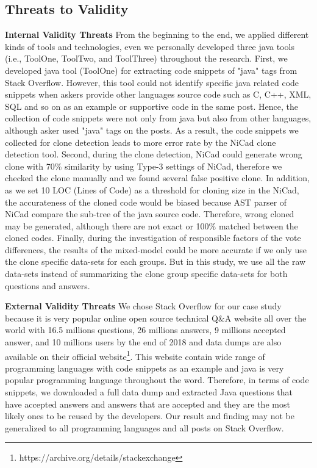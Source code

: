 \documentclass[conference]{IEEEtran}
\begin{document}
\subsection{Threats to Validity}\label{TTV}
\textbf{Internal Validity Threats} From the beginning to the end, we applied different kinds of tools and technologies, even we personally developed three java tools (i.e., ToolOne, ToolTwo, and ToolThree) throughout the research. First, we developed java tool (ToolOne) for extracting code snippets of "java" tags from Stack Overflow. However, this tool could not identify specific java  related code snippets when askers provide other languages source code such as C, C++, XML, SQL and so on as an example or supportive code in the same post. Hence, the collection of code snippets were not only from java but also from other languages, although asker used "java" tags on the posts.  As a result, the code snippets we collected for clone detection leads to more error rate by the NiCad clone detection tool. Second, during the clone detection, NiCad could generate wrong clone with 70\% similarity by using Type-3 settings of NiCad, therefore we checked the clone manually and we found several false positive clone. In addition, as we set 10 LOC (Lines of Code) as a threshold for cloning size in the NiCad,  the accurateness of the cloned code would be biased because AST parser of NiCad compare the sub-tree of the java source code. Therefore, wrong cloned may be generated, although there are not exact or 100\% matched between the cloned codes. Finally, during the investigation of responsible factors of the vote differences, the results of the mixed-model could be more accurate if we only use the clone specific data-sets for each groups. But in this study, we use all the raw data-sets instead of summarizing the clone group specific data-sets for both questions and answers.\newline

\textbf{External Validity Threats} We chose Stack Overflow for our case study because it is very popular online open source technical Q\&A website all over the world with 16.5 millions questions, 26 millions answers, 9 millions accepted answer, and 10 millions users by the end of 2018 and data dumps are also available on their official website\footnote{https://archive.org/details/stackexchange}. This website contain wide range of programming languages with code snippets as an example and java is very popular programming language throughout the word. Therefore, in terms of code snippets, we downloaded a full data dump and extracted Java questions that have accepted answers and answers that are accepted and they are the most likely ones to be reused by the developers. Our result and finding may not be generalized to all programming languages and all posts on Stack Overflow.
\end{document}
